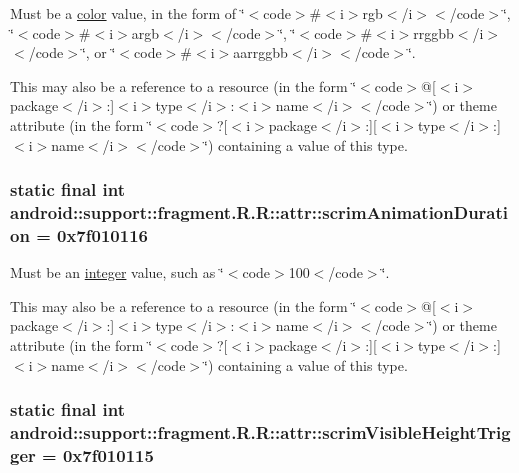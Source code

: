 Must be a \hyperlink{classandroid_1_1support_1_1fragment_1_1_r_1_1color}{color} value, in the form of \char`\"{}$<$code$>$\#$<$i$>$rgb$<$/i$>$$<$/code$>$\char`\"{}, \char`\"{}$<$code$>$\#$<$i$>$argb$<$/i$>$$<$/code$>$\char`\"{}, \char`\"{}$<$code$>$\#$<$i$>$rrggbb$<$/i$>$$<$/code$>$\char`\"{}, or \char`\"{}$<$code$>$\#$<$i$>$aarrggbb$<$/i$>$$<$/code$>$\char`\"{}. 

This may also be a reference to a resource (in the form \char`\"{}$<$code$>$@\mbox{[}$<$i$>$package$<$/i$>$:\mbox{]}$<$i$>$type$<$/i$>$:$<$i$>$name$<$/i$>$$<$/code$>$\char`\"{}) or theme attribute (in the form \char`\"{}$<$code$>$?\mbox{[}$<$i$>$package$<$/i$>$:\mbox{]}\mbox{[}$<$i$>$type$<$/i$>$:\mbox{]}$<$i$>$name$<$/i$>$$<$/code$>$\char`\"{}) containing a value of this type. \hypertarget{classandroid_1_1support_1_1fragment_1_1_r_1_1attr_d7816e691f258ef805d4e7d132bb45d2}{
\subsubsection[{scrimAnimationDuration}]{\setlength{\rightskip}{0pt plus 5cm}static final int android::support::fragment.R.R::attr::scrimAnimationDuration = 0x7f010116}}
\label{classandroid_1_1support_1_1fragment_1_1_r_1_1attr_d7816e691f258ef805d4e7d132bb45d2}


Must be an \hyperlink{classandroid_1_1support_1_1fragment_1_1_r_1_1integer}{integer} value, such as \char`\"{}$<$code$>$100$<$/code$>$\char`\"{}. 

This may also be a reference to a resource (in the form \char`\"{}$<$code$>$@\mbox{[}$<$i$>$package$<$/i$>$:\mbox{]}$<$i$>$type$<$/i$>$:$<$i$>$name$<$/i$>$$<$/code$>$\char`\"{}) or theme attribute (in the form \char`\"{}$<$code$>$?\mbox{[}$<$i$>$package$<$/i$>$:\mbox{]}\mbox{[}$<$i$>$type$<$/i$>$:\mbox{]}$<$i$>$name$<$/i$>$$<$/code$>$\char`\"{}) containing a value of this type. \hypertarget{classandroid_1_1support_1_1fragment_1_1_r_1_1attr_fe806d037bf501d4a6e2719178969b94}{
\subsubsection[{scrimVisibleHeightTrigger}]{\setlength{\rightskip}{0pt plus 5cm}static final int android::support::fragment.R.R::attr::scrimVisibleHeightTrigger = 0x7f010115}}
\label{classandroid_1_1support_1_1fragment_1_1_r_1_1attr_fe806d037bf501d4a6e2719178969b94}


